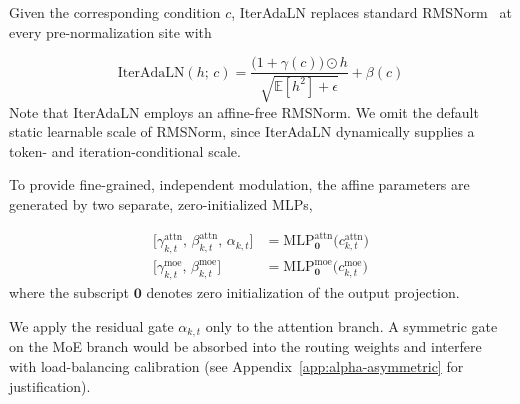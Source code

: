 Given the corresponding condition $c$, IterAdaLN replaces standard RMSNorm~\cite{zhang2019root} at every pre-normalization site with

\begingroup
\small
\begin{equation}
  \mathrm{IterAdaLN}(h;\,c) =
     \frac{\big(1+\gamma(c)\big) \odot h}{\sqrt{\mathbb{E}[h^2]+\epsilon}}
    + \beta(c)
  \label{eq:iteradaln}
\end{equation}
\endgroup
\noindent Note that IterAdaLN employs an affine-free RMSNorm. We omit the default static learnable scale of RMSNorm, since IterAdaLN dynamically supplies a token- and iteration-conditional scale.

To provide fine-grained, independent modulation, the affine parameters are generated by two separate, zero-initialized MLPs,

\begingroup
\small
\begin{align}
  \big[\gamma^{\mathrm{attn}}_{k,t},\,\beta^{\mathrm{attn}}_{k,t},\,\alpha_{k,t}\big]
  &= \mathrm{MLP}^{\mathrm{attn}}_{\mathbf{0}}\!\big(c^{\mathrm{attn}}_{k,t}\big)
    \label{eq:mlp_attn} \\
  \big[\gamma^{\mathrm{moe}}_{k,t},\,\beta^{\mathrm{moe}}_{k,t}\big]
  &= \mathrm{MLP}^{\mathrm{moe}}_{\mathbf{0}}\!\big(c^{\mathrm{moe}}_{k,t}\big)
    \label{eq:mlp_moe}
\end{align}
\endgroup
\noindent where the subscript $\mathbf{0}$ denotes zero initialization of the output projection.

We apply the residual gate $\alpha_{k,t}$ only to the attention branch. A symmetric gate on the MoE branch would be absorbed into the routing weights and interfere with load-balancing calibration (see Appendix~\ref{app:alpha-asymmetric} for justification).




